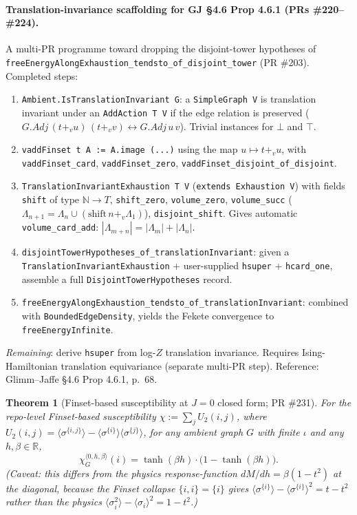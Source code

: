 \documentclass[a4paper,11pt]{article}
\newtheorem{theorem}{Theorem}
\begin{document}
\paragraph{Translation-invariance scaffolding for GJ \S 4.6
Prop 4.6.1 (PRs \#220--\#224).}
A multi-PR programme toward dropping the disjoint-tower hypotheses
of \texttt{freeEnergyAlongExhaustion\_tendsto\_of\_disjoint\_tower}
(PR \#203). Completed steps:
\begin{enumerate}
\item \texttt{Ambient.IsTranslationInvariant G}: a
  \texttt{SimpleGraph V} is translation invariant under an
  \texttt{AddAction T V} if the edge relation is preserved
  ($G.Adj\,(t +_v u)\,(t +_v v) \leftrightarrow G.Adj\,u\,v$).
  Trivial instances for $\bot$ and $\top$.
\item \texttt{vaddFinset t A := A.image (...)} using the map
  $u \mapsto t +_v u$, with
  \texttt{vaddFinset\_card}, \texttt{vaddFinset\_zero},
  \texttt{vaddFinset\_disjoint\_of\_disjoint}.
\item \texttt{TranslationInvariantExhaustion T V}
  (\texttt{extends Exhaustion V}) with fields
  \texttt{shift} of type $\mathbb N \to T$, \texttt{shift\_zero},
  \texttt{volume\_zero}, \texttt{volume\_succ}
  ($\Lambda_{n+1} = \Lambda_n \cup (\mathrm{shift}\,n
  +_v \Lambda_1)$),
  \texttt{disjoint\_shift}. Gives automatic
  \texttt{volume\_card\_add}: $|\Lambda_{m+n}| = |\Lambda_m| +
  |\Lambda_n|$.
\item \texttt{disjointTowerHypotheses\_of\_translationInvariant}:
  given a \texttt{TranslationInvariantExhaustion} + user-supplied
  \texttt{hsuper} + \texttt{hcard\_one}, assemble a full
  \texttt{DisjointTowerHypotheses} record.
\item \texttt{freeEnergyAlongExhaustion\_tendsto\_of\_translationInvariant}:
  combined with \texttt{BoundedEdgeDensity}, yields the Fekete
  convergence to \texttt{freeEnergyInfinite}.
\end{enumerate}
\emph{Remaining}: derive \texttt{hsuper} from log-$Z$ translation
invariance. Requires Ising-Hamiltonian translation equivariance
(separate multi-PR step).
Reference: Glimm--Jaffe \cite{glimm-jaffe} \S 4.6 Prop 4.6.1,
p.~68.

\begin{theorem}[Finset-based susceptibility at $J = 0$ closed form;
PR \#231]
For the repo-level Finset-based susceptibility
$\chi := \sum_j U_2(i,j)$, where $U_2(i,j) = \langle
\sigma^{\{i,j\}}\rangle - \langle\sigma^{\{i\}}\rangle
\langle\sigma^{\{j\}}\rangle$,
for any ambient graph $G$ with finite $\iota$ and any
$h, \beta \in \mathbb{R}$,
\[
  \chi^{\langle 0, h, \beta\rangle}_G(i)
  = \tanh(\beta h) \cdot \big(1 - \tanh(\beta h)\big).
\]
(Caveat: this differs from the physics response-function
$dM/dh = \beta(1-t^2)$ at the diagonal, because the Finset
collapse $\{i,i\} = \{i\}$ gives
$\langle\sigma^{\{i\}}\rangle - \langle\sigma^{\{i\}}\rangle^2
= t - t^2$ rather than the physics
$\langle\sigma_i^2\rangle - \langle\sigma_i\rangle^2 = 1 - t^2$.)
\end{theorem}
\end{document}
